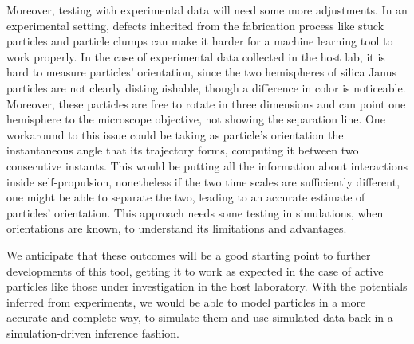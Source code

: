 \documentclass[../../master_thesis_np.tex]{subfiles}
\begin{document}
Moreover, testing with experimental data will need some more adjustments.
In an experimental setting, defects inherited from the fabrication process like stuck particles and particle clumps can make it harder for a machine learning tool to work properly.
In the case of experimental data collected in the host lab, it is hard to measure particles' orientation, since the two hemispheres of silica Janus particles are not clearly distinguishable, though a difference in color is noticeable.
Moreover, these particles are free to rotate in three dimensions and can point one hemisphere to the microscope objective, not showing the separation line.
One workaround to this issue could be taking as particle's orientation the instantaneous angle that its trajectory forms, computing it between two consecutive instants.
This would be putting all the information about interactions inside self-propulsion, nonetheless if the two time scales are sufficiently different, one might be able to separate the two, leading to an accurate estimate of particles' orientation.
This approach needs some testing in simulations, when orientations are known, to understand its limitations and advantages.

We anticipate that these outcomes will be a good starting point to further developments of this tool, getting it to work as expected in the case of active particles like those under investigation in the host laboratory.
With the potentials inferred from experiments, we would be able to model particles in a more accurate and complete way, to simulate them and use simulated data back in a simulation-driven inference fashion.
\end{document}
